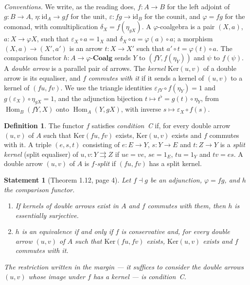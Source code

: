 \documentclass[11pt]{article}
\theoremstyle{plain}
\newtheorem*{enonce}{Statement}
\theoremstyle{definition}
\newtheorem*{definition}{Definition}
\theoremstyle{remark}
\begin{document}
\noindent\emph{Conventions.} We write, as the reading does, $f : A \to B$ for the left adjoint of $g : B \to A$, $\eta : \mathrm{id}_A \to gf$ for the unit, $\varepsilon : fg \to \mathrm{id}_B$ for the counit, and $\varphi = fg$ for the comonad, with comultiplication $\delta_X = f(\eta_{gX})$. A $\varphi$-coalgebra is a pair $(X, a)$, $a : X \to \varphi X$, such that $\varepsilon_X \circ a = 1_X$ and $\delta_X \circ a = \varphi(a) \circ a$; a morphism $(X, a) \to (X', a')$ is an arrow $t : X \to X'$ such that $a' \circ t = \varphi(t) \circ a$. The comparison functor $h : A \to \varphi\text{-}\mathbf{Coalg}$ sends $Y$ to $(fY, f(\eta_Y))$ and $\psi$ to $f(\psi)$. A \emph{double arrow} is a parallel pair of arrows. The \emph{kernel} $\mathrm{Ker}(u, v)$ of a double arrow is its equaliser, and $f$ \emph{commutes with it} if it sends a kernel of $(u, v)$ to a kernel of $(fu, fv)$. We use the triangle identities $\varepsilon_{fY} \circ f(\eta_Y) = 1$ and $g(\varepsilon_X) \circ \eta_{gX} = 1$, and the adjunction bijection $t \mapsto t^\flat = g(t) \circ \eta_Y$, from $\operatorname{Hom}_B(fY, X)$ onto $\operatorname{Hom}_A(Y, gX)$, with inverse $s \mapsto \varepsilon_X \circ f(s)$.

\begin{definition}
The functor $f$ satisfies \emph{condition~C} if, for every double arrow $(u, v)$ of $A$ such that $\mathrm{Ker}(fu, fv)$ exists, $\mathrm{Ker}(u, v)$ exists and $f$ commutes with it. A triple $(e, s, t)$ consisting of $e : E \to Y$, $s : Y \to E$ and $t : Z \to Y$ is a \emph{split kernel} (split equaliser) of $u, v : Y \rightrightarrows Z$ if $ue = ve$, $se = 1_E$, $tu = 1_Y$ and $tv = es$. A double arrow $(u, v)$ of $A$ is \emph{$f$-split} if $(fu, fv)$ has a split kernel.
\end{definition}

\begin{enonce}[Theorem 1.12, page 4]
Let $f \dashv g$ be an adjunction, $\varphi = fg$, and $h$ the comparison functor.
\begin{enumerate}
\item[a)] If kernels of double arrows exist in $A$ and $f$ commutes with them, then $h$ is essentially surjective.
\item[b)] $h$ is an equivalence if and only if $f$ is conservative and, for every double arrow $(u, v)$ of $A$ such that $\mathrm{Ker}(fu, fv)$ exists, $\mathrm{Ker}(u, v)$ exists and $f$ commutes with it.
\end{enumerate}
The restriction written in the margin --- it suffices to consider the double arrows $(u, v)$ whose image under $f$ has a kernel --- is condition~C.
\end{enonce}
\end{document}
